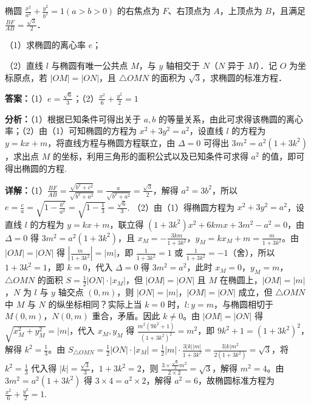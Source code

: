 \begin{question}[points=15]
椭圆 $\frac{x^2}{a^2}+\frac{y^2}{b^2}=1(a>b>0)$ 的右焦点为 $F$、右顶点为 $A$，上顶点为 $B$，且满足 $\frac{BF}{AB}=\frac{\sqrt{3}}{2}$．

（1）求椭圆的离心率 $e$；

（2）直线 $l$ 与椭圆有唯一公共点 $M$，与 $y$ 轴相交于 $N$（$N$ 异于 $M$）．记 $O$ 为坐标原点，若 $|OM|=|ON|$，且 $\triangle OMN$ 的面积为 $\sqrt{3}$，求椭圆的标准方程．
\begin{solution}
\textbf{答案：}（1）$e=\frac{\sqrt{6}}{3}$；（2）$\frac{x^2}{6}+\frac{y^2}{2}=1$

\textbf{分析：}（1）根据已知条件可得出关于 $a,b$ 的等量关系，由此可求得该椭圆的离心率；（2）由（1）可知椭圆的方程为 $x^2+3y^2=a^2$，设直线 $l$ 的方程为 $y=kx+m$，将直线方程与椭圆方程联立，由 $\Delta=0$ 可得出 $3m^2=a^2(1+3k^2)$，求出点 $M$ 的坐标，利用三角形的面积公式以及已知条件可求得 $a^2$ 的值，即可得出椭圆的方程.

\textbf{详解：}（1）$\frac{BF}{AB}=\frac{\sqrt{b^2+c^2}}{\sqrt{b^2+a^2}}=\frac{a}{\sqrt{b^2+a^2}}=\frac{\sqrt{3}}{2}$，解得 $a^2=3b^2$，所以 $e=\frac{c}{a}=\sqrt{1-\frac{b^2}{a^2}}=\sqrt{1-\frac{1}{3}}=\frac{\sqrt{6}}{3}$.
（2）由（1）得椭圆方程为 $x^2+3y^2=a^2$，设直线 $l$ 的方程为 $y=kx+m$，联立得 $(1+3k^2)x^2+6kmx+3m^2-a^2=0$，由 $\Delta=0$ 得 $3m^2=a^2(1+3k^2)$，且 $x_M=-\frac{3km}{1+3k^2}$，$y_M=kx_M+m=\frac{m}{1+3k^2}$。由 $|OM|=|ON|$ 得 $|\frac{m}{1+3k^2}|=|m|$，即 $\frac{1}{1+3k^2}=1$ 或 $\frac{1}{1+3k^2}=-1$（舍），所以 $1+3k^2=1$，即 $k=0$，代入 $\Delta=0$ 得 $3m^2=a^2$，此时 $x_M=0$，$y_M=m$，$\triangle OMN$ 的面积 $S=\frac{1}{2}|ON|\cdot|x_M|$，但 $|OM|=|ON|$ 且 $M$ 在椭圆上，$|OM|=|m|$，$N$ 为 $l$ 与 $y$ 轴交点 $(0,m)$，则 $|ON|=|m|$，$|OM|=|ON|$ 成立，但 $\triangle OMN$ 中 $M$ 与 $N$ 的纵坐标相同？实际上当 $k=0$ 时，$l:y=m$，与椭圆相切于 $M(0,m)$，$N(0,m)$ 重合，矛盾。因此 $k\neq0$。由 $|OM|=|ON|$ 得 $\sqrt{x_M^2+y_M^2}=|m|$，代入 $x_M,y_M$ 得 $\frac{m^2(9k^2+1)}{(1+3k^2)^2}=m^2$，即 $9k^2+1=(1+3k^2)^2$，解得 $k^2=\frac{1}{3}$。由 $S_{\triangle OMN}=\frac{1}{2}|ON|\cdot|x_M|=\frac{1}{2}|m|\cdot\frac{3|k||m|}{1+3k^2}=\frac{3|k|m^2}{2(1+3k^2)}=\sqrt{3}$，将 $k^2=\frac{1}{3}$ 代入得 $|k|=\frac{\sqrt{3}}{3}$，$1+3k^2=2$，则 $\frac{3\times\frac{\sqrt{3}}{3}m^2}{2\times2}=\sqrt{3}$，解得 $m^2=4$。由 $3m^2=a^2(1+3k^2)$ 得 $3\times4=a^2\times2$，解得 $a^2=6$，故椭圆标准方程为 $\frac{x^2}{6}+\frac{y^2}{2}=1$.
\end{solution}
\end{question}

